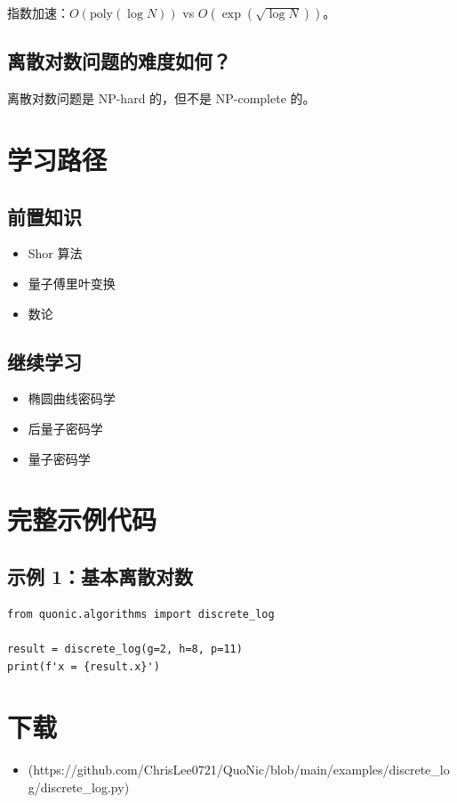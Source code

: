 \documentclass[12pt,a4paper]{article}
\begin{document}
指数加速：$O(\text{poly}(\log N))$ vs $O(\exp(\sqrt{\log N}))$。

\subsection{离散对数问题的难度如何？}

离散对数问题是 NP-hard 的，但不是 NP-complete 的。

\section{学习路径}

\subsection{前置知识}
\begin{itemize}
  \item Shor 算法
  \item 量子傅里叶变换
  \item 数论
\end{itemize}

\subsection{继续学习}
\begin{itemize}
  \item 椭圆曲线密码学
  \item 后量子密码学
  \item 量子密码学
\end{itemize}

\section{完整示例代码}

\subsection{示例 1：基本离散对数}

\begin{verbatim}
from quonic.algorithms import discrete_log

result = discrete_log(g=2, h=8, p=11)
print(f'x = {result.x}')
\end{verbatim}

\section{下载}

\begin{itemize}
  \item [discrete\_log.py](https://github.com/ChrisLee0721/QuoNic/blob/main/examples/discrete_log/discrete_log.py)
\end{itemize}
\end{document}
